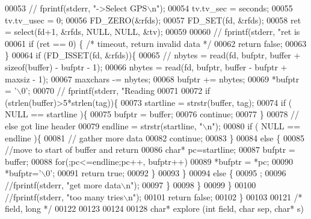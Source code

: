 \begin{DoxyCode}
00053     \textcolor{comment}{//  fprintf(stderr, "->Select GPS\(\backslash\)n");}
00054     tv.tv\_sec = seconds;
00055     tv.tv\_usec = 0;
00056     FD\_ZERO(&rfds);
00057     FD\_SET(fd, &rfds);
00058     ret = select(fd+1, &rfds, NULL, NULL, &tv);
00059 
00060     \textcolor{comment}{//  fprintf(stderr, "ret is %
00061     \textcolor{keywordflow}{if} (ret == 0) \{ \textcolor{comment}{/* timeout, return invalid data */}
00062       \textcolor{keywordflow}{return} \textcolor{keyword}{false};
00063     \}
00064     \textcolor{keywordflow}{if} (FD\_ISSET(fd, &rfds))\{
00065       \textcolor{comment}{//      nbytes = read(fd, bufptr, buffer + sizeof(buffer) - bufptr - 1);}
00066       nbytes = read(fd, bufptr, buffer - bufptr + maxsiz - 1);
00067       maxchars -= nbytes;
00068       bufptr += nbytes;
00069       *bufptr = \textcolor{charliteral}{'\(\backslash\)0'};
00070       \textcolor{comment}{//      fprintf(stderr, "Reading %
00071 
00072       \textcolor{keywordflow}{if} (strlen(buffer)>5*strlen(tag))\{
00073         startline = strstr(buffer, tag);
00074         \textcolor{keywordflow}{if} ( NULL == startline )\{
00075           bufptr = buffer;
00076           \textcolor{keywordflow}{continue};
00077         \}
00078         \textcolor{comment}{// else got line header}
00079         endline = strstr(startline, \textcolor{stringliteral}{"\(\backslash\)n"});
00080         \textcolor{keywordflow}{if} ( NULL == endline )\{
00081           \textcolor{comment}{// gather more data}
00082           \textcolor{keywordflow}{continue};
00083         \}
00084         \textcolor{keywordflow}{else} \{
00085           \textcolor{comment}{//move to start of buffer and return}
00086           \textcolor{keywordtype}{char}* pc=startline;
00087           bufptr = buffer;
00088           \textcolor{keywordflow}{for}(;pc<=endline;pc++, bufptr++)
00089             *bufptr = *pc;
00090           *bufptr=\textcolor{charliteral}{'\(\backslash\)0'};
00091           \textcolor{keywordflow}{return} \textcolor{keyword}{true};
00092         \}
00093       \}
00094       \textcolor{keywordflow}{else} \{
00095         ;
00096         \textcolor{comment}{//fprintf(stderr, "get more data\(\backslash\)n");}
00097       \}
00098     \}
00099   \}
00100   \textcolor{comment}{//fprintf(stderr, "too many tries\(\backslash\)n");}
00101   \textcolor{keywordflow}{return} \textcolor{keyword}{false};
00102 \}
00103 
00121 \textcolor{comment}{/* field, long */}
00122 
00123 
00124 
00128 \textcolor{keywordtype}{char}* explore (\textcolor{keywordtype}{int} field, \textcolor{keywordtype}{char} sep, \textcolor{keywordtype}{char}* s)
}}
\end{DoxyCode}
